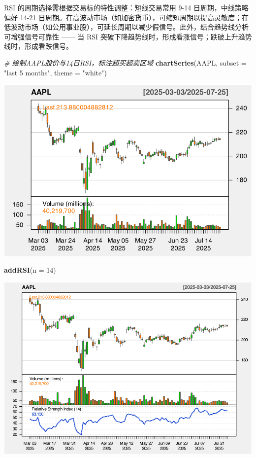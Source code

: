 \documentclass[]{ctexbook}
\newenvironment{Shaded}{\begin{snugshade}}{\end{snugshade}}
\newcommand{\AttributeTok}[1]{\textcolor[rgb]{0.13,0.29,0.53}{#1}}
\newcommand{\CommentTok}[1]{\textcolor[rgb]{0.56,0.35,0.01}{\textit{#1}}}
\newcommand{\DecValTok}[1]{\textcolor[rgb]{0.00,0.00,0.81}{#1}}
\newcommand{\FunctionTok}[1]{\textcolor[rgb]{0.13,0.29,0.53}{\textbf{#1}}}
\newcommand{\NormalTok}[1]{#1}
\newcommand{\StringTok}[1]{\textcolor[rgb]{0.31,0.60,0.02}{#1}}
\begin{document}
RSI 的周期选择需根据交易标的特性调整：短线交易常用 9-14 日周期，中线策略偏好 14-21 日周期。在高波动市场（如加密货币），可缩短周期以提高灵敏度；在低波动市场（如公用事业股），可延长周期以减少假信号。此外，结合趋势线分析可增强信号可靠性 ------ 当 RSI 突破下降趋势线时，形成看涨信号；跌破上升趋势线时，形成看跌信号。

\begin{Shaded}
\begin{Highlighting}[]
\CommentTok{\# 绘制AAPL股价与14日RSI，标注超买超卖区域}
\FunctionTok{chartSeries}\NormalTok{(AAPL, }\AttributeTok{subset =} \StringTok{"last 5 months"}\NormalTok{, }\AttributeTok{theme =} \StringTok{"white"}\NormalTok{)}
\end{Highlighting}
\end{Shaded}

\includegraphics[width=0.9\linewidth]{QuantmodHandbook_files/figure-latex/rsi-1}

\begin{Shaded}
\begin{Highlighting}[]
\FunctionTok{addRSI}\NormalTok{(}\AttributeTok{n =} \DecValTok{14}\NormalTok{)}
\end{Highlighting}
\end{Shaded}

\includegraphics[width=0.9\linewidth]{QuantmodHandbook_files/figure-latex/rsi-2}
\end{document}
